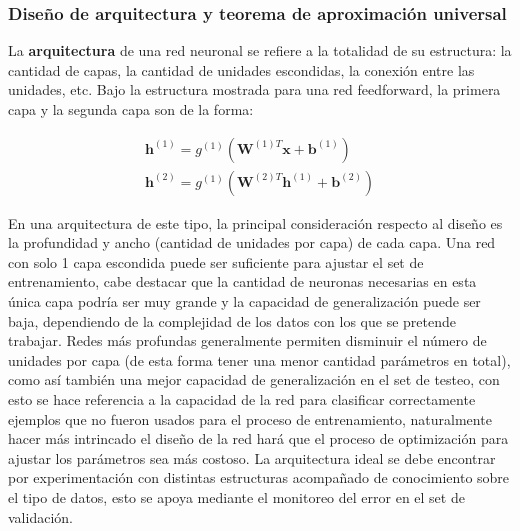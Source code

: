 \subsubsection{Dise\~{n}o de arquitectura y teorema de aproximaci\'on universal}

La \textbf{arquitectura} de una red neuronal se refiere a la totalidad de su estructura: la cantidad de capas, la cantidad de unidades escondidas, la conexi\'on entre las unidades, etc. Bajo la estructura mostrada para una red feedforward, la primera capa y la segunda capa son de la forma:

\begin{equation}
\begin{split}
\bm{h}^{(1)} = g^{(1)}(\bm{W}^{(1) T}\bm{x} + \bm{b}^{(1)}) \\
\bm{h}^{(2)} = g^{(1)}(\bm{W}^{(2) T}\bm{h}^{(1)} + \bm{b}^{(2)})
\end{split}
\end{equation}

En una arquitectura de este tipo, la principal consideraci\'on respecto al dise\~{n}o es la profundidad y ancho (cantidad de unidades por capa) de cada capa. Una red con solo 1 capa escondida puede ser suficiente para ajustar el set de entrenamiento, cabe destacar que la cantidad de neuronas necesarias en esta única capa podría ser muy grande y la capacidad de generalización puede ser baja, dependiendo de la complejidad de los datos con los que se pretende trabajar. Redes m\'as profundas generalmente permiten disminuir el n\'umero de unidades por capa (de esta forma tener una menor cantidad par\'ametros en total), como as\'i tambi\'en una mejor capacidad de generalización en el set de testeo, con esto se hace referencia a la capacidad de la red para clasificar correctamente ejemplos que no fueron usados para el proceso de entrenamiento, naturalmente hacer más intrincado el diseño de la red hará que el proceso de optimización para ajustar los parámetros sea más costoso. La arquitectura ideal se debe encontrar por experimentaci\'on con distintas estructuras acompañado de conocimiento sobre el tipo de datos, esto se apoya mediante el monitoreo del error en el set de validaci\'on.


